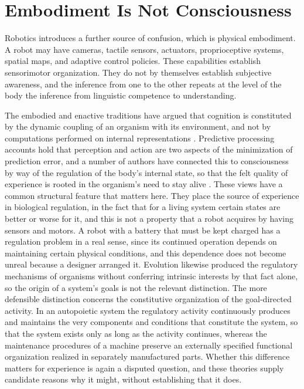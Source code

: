 \documentclass[12pt]{article}
\theoremstyle{definition}
\begin{document}
\section{Embodiment Is Not Consciousness}
\label{sec:embodiment}

Robotics introduces a further source of confusion, which is physical embodiment. A robot may have cameras, tactile sensors, actuators, proprioceptive systems, spatial maps, and adaptive control policies. These capabilities establish sensorimotor organization. They do not by themselves establish subjective awareness, and the inference from one to the other repeats at the level of the body the inference from linguistic competence to understanding.

The embodied and enactive traditions have argued that cognition is constituted by the dynamic coupling of an organism with its environment, and not by computations performed on internal representations \cite{varela1991,thompson2007}. Predictive processing accounts hold that perception and action are two aspects of the minimization of prediction error, and a number of authors have connected this to consciousness by way of the regulation of the body's internal state, so that the felt quality of experience is rooted in the organism's need to stay alive \cite{seth2021,damasio1999}. These views have a common structural feature that matters here. They place the source of experience in biological regulation, in the fact that for a living system certain states are better or worse for it, and this is not a property that a robot acquires by having sensors and motors. A robot with a battery that must be kept charged has a regulation problem in a real sense, since its continued operation depends on maintaining certain physical conditions, and this dependence does not become unreal because a designer arranged it. Evolution likewise produced the regulatory mechanisms of organisms without conferring intrinsic interests by that fact alone, so the origin of a system's goals is not the relevant distinction. The more defensible distinction concerns the constitutive organization of the goal-directed activity. In an autopoietic system the regulatory activity continuously produces and maintains the very components and conditions that constitute the system, so that the system exists only as long as the activity continues, whereas the maintenance procedures of a machine preserve an externally specified functional organization realized in separately manufactured parts. Whether this difference matters for experience is again a disputed question, and these theories supply candidate reasons why it might, without establishing that it does.
\end{document}
